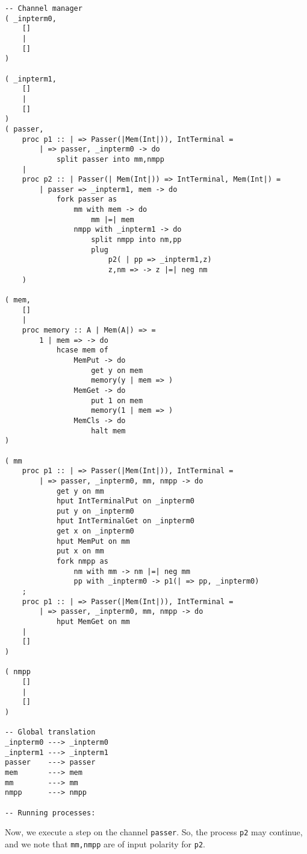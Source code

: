 \documentclass{article}
\theoremstyle{plain}%
\theoremstyle{definition}
\theoremstyle{remark}
\begin{document}
\begin{verbatim}
-- Channel manager
( _inpterm0,  
    []
    |
    []
)

( _inpterm1,  
    []
    |
    []
)
( passer,
    proc p1 :: | => Passer(|Mem(Int|)), IntTerminal = 
        | => passer, _inpterm0 -> do
            split passer into mm,nmpp 
    |
    proc p2 :: | Passer(| Mem(Int|)) => IntTerminal, Mem(Int|) =
        | passer => _inpterm1, mem -> do
            fork passer as
                mm with mem -> do
                    mm |=| mem
                nmpp with _inpterm1 -> do
                    split nmpp into nm,pp
                    plug
                        p2( | pp => _inpterm1,z)
                        z,nm => -> z |=| neg nm
    )

( mem,
    []
    |
    proc memory :: A | Mem(A|) => =
        1 | mem => -> do
            hcase mem of
                MemPut -> do
                    get y on mem
                    memory(y | mem => )
                MemGet -> do
                    put 1 on mem
                    memory(1 | mem => )
                MemCls -> do
                    halt mem
)

( mm
    proc p1 :: | => Passer(|Mem(Int|)), IntTerminal = 
        | => passer, _inpterm0, mm, nmpp -> do
            get y on mm
            hput IntTerminalPut on _inpterm0
            put y on _inpterm0
            hput IntTerminalGet on _inpterm0
            get x on _inpterm0
            hput MemPut on mm
            put x on mm
            fork nmpp as
                nm with mm -> nm |=| neg mm
                pp with _inpterm0 -> p1(| => pp, _inpterm0)
    ;
    proc p1 :: | => Passer(|Mem(Int|)), IntTerminal = 
        | => passer, _inpterm0, mm, nmpp -> do
            hput MemGet on mm 
    |
    []
)

( nmpp
    []
    |
    []
)

-- Global translation
_inpterm0 ---> _inpterm0 
_inpterm1 ---> _inpterm1 
passer    ---> passer 
mem       ---> mem
mm        ---> mm
nmpp      ---> nmpp

-- Running processes:
\end{verbatim}
Now, we execute a step on the channel \verb|passer|.
So, the process \verb|p2| may continue, and we note that
    \verb|mm,nmpp| are of input polarity for \verb|p2|.
\end{document}
